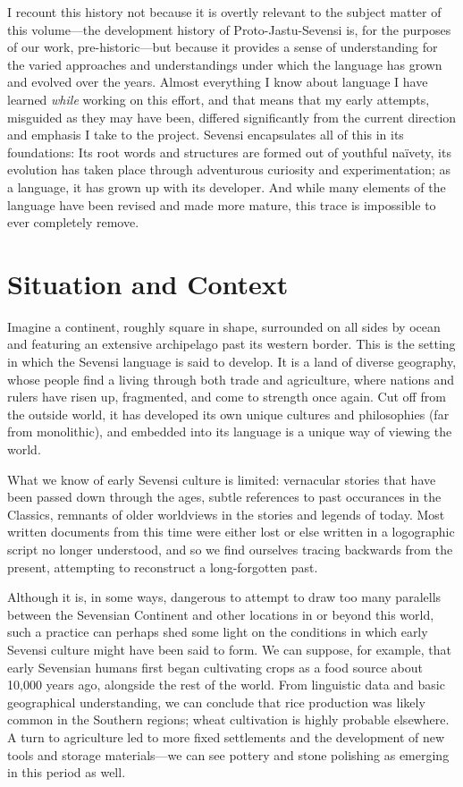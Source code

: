 I recount this history not because it is overtly relevant to the subject matter of this volume—the development history of Proto-Jastu-Sevensi is, for the purposes of our work, pre-historic—but because it provides a sense of understanding for the varied approaches and understandings under which the language has grown and evolved over the years.
Almost everything I know about language I have learned \emph{while} working on this effort, and that means that my early attempts, misguided as they may have been, differed significantly from the current direction and emphasis I take to the project.
Sevensi encapsulates all of this in its foundations: Its root words and structures are formed out of youthful naïvety, its evolution has taken place through adventurous curiosity and experimentation; as a language, it has grown up with its developer.
And while many elements of the language have been revised and made more mature, this trace is impossible to ever completely remove.

\section{Situation and Context}

Imagine a continent, roughly square in shape, surrounded on all sides by ocean and featuring an extensive archipelago past its western border.
This is the setting in which the Sevensi language is said to develop.
It is a land of diverse geography, whose people find a living through both trade and agriculture, where nations and rulers have risen up, fragmented, and come to strength once again.
Cut off from the outside world, it has developed its own unique cultures and philosophies (far from monolithic), and embedded into its language is a unique way of viewing the world.

What we know of early Sevensi culture is limited: vernacular stories that have been passed down through the ages, subtle  references to past occurances in the Classics, remnants of older worldviews in the stories and legends of today.
Most written documents from this time were either lost or else written in a logographic script no longer understood, and so we find ourselves tracing backwards from the present, attempting to reconstruct a long-forgotten past.

Although it is, in some ways, dangerous to attempt to draw too many paralells between the Sevensian Continent and other locations in or beyond this world, such a practice can perhaps shed some light on the conditions in which early Sevensi culture might have been said to form.
We can suppose, for example, that early Sevensian humans first began cultivating crops as a food source about 10,000 years ago, alongside the rest of the world.
From linguistic data and basic geographical understanding, we can conclude that rice production was likely common in the Southern regions; wheat cultivation is highly probable elsewhere.
A turn to agriculture led to more fixed settlements and the development of new tools and storage materials—we can see pottery and stone polishing as emerging in this period as well.

